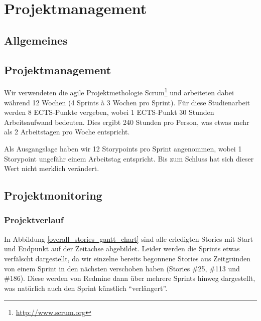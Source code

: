 \chapter{Projektmanagement}

\section{Allgemeines}

\section{Projektmanagement}
\label{projektmanagement}
Wir verwendeten die agile Projektmethologie Scrum\footnote{\url{http://www.scrum.org}} und arbeiteten dabei während 12 Wochen (4 Sprints à 3 Wochen pro Sprint).
Für diese Studienarbeit werden 8 ECTS-Punkte vergeben, wobei 1 ECTS-Punkt 30 Stunden Arbeitsaufwand bedeuten.
Dies ergibt 240 Stunden pro Person, was etwas mehr als 2 Arbeitstagen pro Woche entspricht.

Als Ausgangslage haben wir 12 Storypoints pro Sprint angenommen, wobei 1 Storypoint ungefähr einem Arbeitstag entspricht. Bis zum Schluss hat sich dieser Wert nicht merklich verändert.











\section{Projektmonitoring}

\subsection{Projektverlauf}
In Abbildung \ref{overall_stories_gantt_chart} sind alle erledigten Stories mit Start- und Endpunkt auf der Zeitachse abgebildet. Leider werden die Sprints etwas verfälscht dargestellt, da wir einzelne bereits begonnene Stories aus Zeitgründen von einem Sprint in den nächsten verschoben haben (Stories \#25, \#113 und \#186). Diese werden von Redmine dann über mehrere Sprints hinweg dargestellt, was natürlich auch den Sprint künstlich "`verlängert"'.


